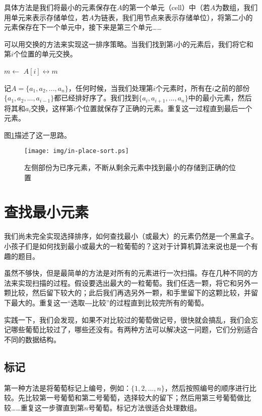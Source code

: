 \documentclass[UTF8]{article}
\begin{document}
具体方法是我们将最小的元素保存在$A$的第一个单元（cell）中（若$A$为数组，我们用单元来表示存储单位，若$A$为链表，我们用节点来表示存储单位），将第二小的元素保存在下一个单元中，接下来是第三个单元……

可以用交换的方法来实现这一排序策略。当我们找到第$i$小的元素后，我们将它和第$i$个位置的单元交换。

\begin{algorithmic}[1]
    \State $m \gets$ 
    \State {} $A[i] \leftrightarrow m$
  \EndFor
\EndFunction
\end{algorithmic}

记$A = \{a_1, a_2, ..., a_n\}$，任何时候，当我们处理第$i$个元素时，所有在$i$之前的部份$\{a_1, a_2, ..., a_{i-1}\}$都已经排好序了。我们找到$\{a_i, a_{i+1}, ..., a_n\}$中的最小元素，然后将其和$a_i$交换，这样第$i$个位置就保存了正确的元素。重复这一过程直到最后一个元素。

图\ref{fig:in-place-sort}描述了这一思路。

\begin{figure}[htbp]
  \centering
  \texttt{[image: img/in-place-sort.ps]}
  \caption{左侧部份为已序元素，不断从剩余元素中找到最小的存储到正确的位置}
  \label{fig:in-place-sort}
\end{figure}

\section{查找最小元素}

我们尚未完全实现选择排序，如何查找最小（或最大）的元素仍然是一个黑盒子。小孩子们是如何找到最小或最大的一粒葡萄的？这对于计算机算法来说也是一个有趣的题目。

虽然不够快，但是最简单的方法是对所有的元素进行一次扫描。存在几种不同的方法来实现扫描的过程。假设要选出最大的一粒葡萄。我们任选一颗，将它和另外一颗比较，然后留下较大的；此后我们再选另外一颗，和手里留下的这颗比较，并留下最大的。重复这一“选取―比较”的过程直到比较完所有的葡萄。

实践一下，我们会发现，如果不对比较过的葡萄做记号，很快就会搞乱，我们会忘记哪些葡萄比较过了，哪些还没有。有两种方法可以解决这一问题，它们分别适合不同的数据结构。

\subsection{标记}
第一种方法是将葡萄标记上编号，例如：$\{1, 2, ..., n\}$，然后按照编号的顺序进行比较。先比较第一号葡萄和第二号葡萄，选择较大的留下；然后用第三号葡萄做比较……重复这一步骤直到第$n$号葡萄。标记方法很适合处理数组。
\end{document}
